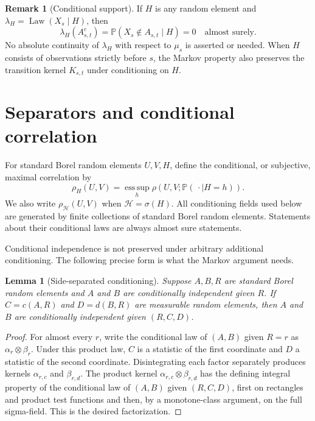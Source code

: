 \documentclass[11pt]{amsart}
\numberwithin{equation}{section}
\newtheorem{lemma}[theorem]{Lemma}
\theoremstyle{definition}
\newtheorem{remark}[theorem]{Remark}
\newcommand{\PP}{\mathbb P}
\newcommand{\cH}{\mathcal H}
\newcommand{\Law}{\operatorname{Law}}
\begin{document}
\begin{remark}[Conditional support]\label{rem:conditional-support}
If $H$ is any random element and $\lambda_H=\Law(X_s\mid H)$, then
\[
\lambda_H(A_{s,t}^c)=\PP(X_s\notin A_{s,t}\mid H)=0
\quad\text{almost surely}.
\]
No absolute continuity of $\lambda_H$ with respect to $\mu_s$ is asserted or needed. When $H$ consists of observations strictly before $s$, the Markov property also preserves the transition kernel $K_{s,t}$ under conditioning on $H$.
\end{remark}

\section{Separators and conditional correlation}\label{sec:separators}

For standard Borel random elements $U,V,H$, define the conditional, or subjective, maximal correlation by
\begin{equation}\label{eq:subjective}
\rho_H(U,V)=\operatorname*{ess\,sup}_{h}
\rho(U,V;\PP(\,\cdot\mid H=h)).
\end{equation}
We also write $\rho_{\cH}(U,V)$ when $\cH=\sigma(H)$. All conditioning fields used below are generated by finite collections of standard Borel random elements. Statements about their conditional laws are always almost sure statements.

Conditional independence is not preserved under arbitrary additional conditioning. The following precise form is what the Markov argument needs.

\begin{lemma}[Side-separated conditioning]\label{lem:side-separated}
Suppose $A,B,R$ are standard Borel random elements and $A$ and $B$ are conditionally independent given $R$. If $C=c(A,R)$ and $D=d(B,R)$ are measurable random elements, then $A$ and $B$ are conditionally independent given $(R,C,D)$.
\end{lemma}

\begin{proof}
For almost every $r$, write the conditional law of $(A,B)$ given $R=r$ as $\alpha_r\otimes\beta_r$. Under this product law, $C$ is a statistic of the first coordinate and $D$ a statistic of the second coordinate. Disintegrating each factor separately produces kernels $\alpha_{r,c}$ and $\beta_{r,d}$. The product kernel $\alpha_{r,c}\otimes\beta_{r,d}$ has the defining integral property of the conditional law of $(A,B)$ given $(R,C,D)$, first on rectangles and product test functions and then, by a monotone-class argument, on the full sigma-field. This is the desired factorization.
\end{proof}
\end{document}

